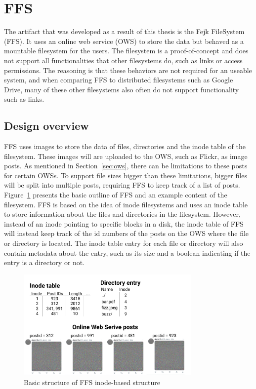\section{FFS}
The artifact that was developed as a result of this thesis is the Fejk FileSystem (FFS). It uses an online web service (\gls{OWS}) to store the data but behaved as a mountable filesystem for the users. The filesystem is a proof-of-concept and does not support all functionalities that other filesystems do, such as links or access permissions. The reasoning is that these behaviors are not required for an useable system, and when comparing FFS to distributed filesystems such as Google Drive, many of these other filesystems also often do not support functionality such as links.

\subsection{Design overview}
FFS uses images to store the data of files, directories and the inode table of the filesystem. These images will are uploaded to the OWS, such as Flickr, as image posts. As mentioned in Section~\ref{sec:ows}, there can be limitations to these posts for certain OWSs. To support file sizes bigger than these limitations, bigger files will be split into multiple posts, requiring FFS to keep track of a list of posts. Figure~\ref{fig:ffs_inode_diag} presents the basic outline of FFS and an example content of the filesystem. FFS is based on the idea of inode filesystems and uses an inode table to store information about the files and directories in the filesystem. However, instead of an inode pointing to specific blocks in a disk, the inode table of FFS will instead keep track of the id numbers of the posts on the OWS where the file or directory is located. The inode table entry for each file or directory will also contain metadata about the entry, such as its size and a boolean indicating if the entry is a directory or not.

\begin{figure}[!ht]
	\begin{center}
	  \includegraphics[width=0.8\textwidth]{figures/ffs_inode_diagram.png}
	\end{center}
	\caption{Basic structure of FFS inode-based structure}
	\label{fig:ffs_inode_diag}
\end{figure}

